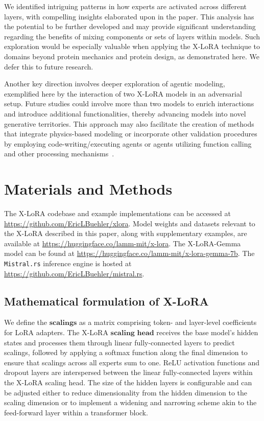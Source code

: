 We identified intriguing patterns in how experts are activated across different layers, with compelling insights elaborated upon in the paper. This analysis has the potential to be further developed and may provide significant understanding regarding the benefits of mixing components or sets of layers within models. Such exploration would be especially valuable when applying the X-LoRA technique to domains beyond protein mechanics and protein design, as demonstrated here. We defer this to future research.

Another key direction involves deeper exploration of agentic modeling, exemplified here by the interaction of two X-LoRA models in an adversarial setup. Future studies could involve more than two models to enrich interactions and introduce additional functionalities, thereby advancing models into novel generative territories. This approach may also facilitate the creation of methods that integrate physics-based modeling or incorporate other validation procedures by employing code-writing/executing agents or agents utilizing function calling and other processing mechanisms~\cite{Ghafarollahi2024ProtAgents:Learning}.

\section{Materials and Methods}

The X-LoRA codebase and example implementations can be accessed at \url{https://github.com/EricLBuehler/xlora}. Model weights and datasets relevant to the X-LoRA described in this paper, along with supplementary examples, are available at \url{https://huggingface.co/lamm-mit/x-lora}. The X-LoRA-Gemma model can be found at \url{https://huggingface.co/lamm-mit/x-lora-gemma-7b}. The \texttt{Mistral.rs} inference engine is hosted at \url{https://github.com/EricLBuehler/mistral.rs}.

\subsection{Mathematical formulation of X-LoRA} We define the $\mathbf{scalings}$ as a matrix comprising token- and layer-level coefficients for LoRA adapters. The X-LoRA $\mathbf{scaling}$ $\mathbf{head}$ receives the base model’s hidden states and processes them through linear fully-connected layers to predict scalings, followed by applying a softmax function along the final dimension to ensure that scalings across all experts sum to one. ReLU activation functions and dropout layers are interspersed between the linear fully-connected layers within the X-LoRA scaling head. The size of the hidden layers is configurable and can be adjusted either to reduce dimensionality from the hidden dimension to the scaling dimension or to implement a widening and narrowing scheme akin to the feed-forward layer within a transformer block.

